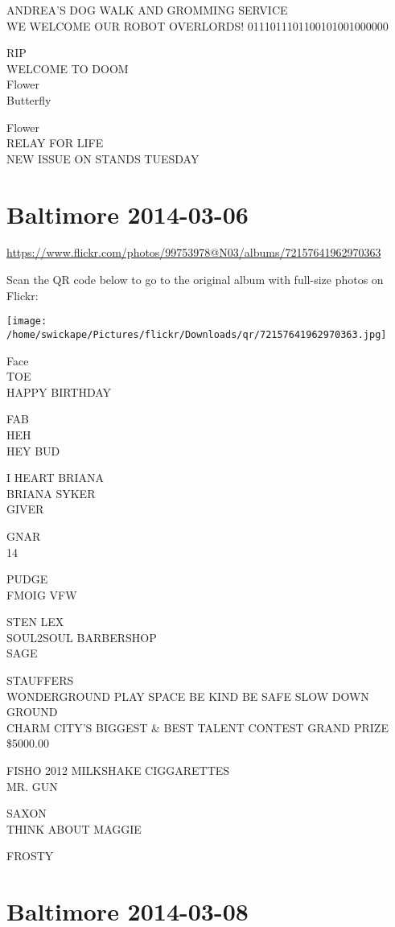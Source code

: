 \documentclass[10pt,letterpaper]{article}
\begin{document}
ANDREA'S DOG WALK AND GROMMING SERVICE\\
WE WELCOME OUR ROBOT OVERLORDS!  0111011101100101001000000

RIP\\
WELCOME TO DOOM\\
Flower\\
Butterfly

Flower\\
RELAY FOR LIFE\\
NEW ISSUE ON STANDS TUESDAY


\section*{Baltimore 2014-03-06}

\url{https://www.flickr.com/photos/99753978@N03/albums/72157641962970363}

Scan the QR code below to go to the original album with full-size photos on Flickr:

\texttt{[image: /home/swickape/Pictures/flickr/Downloads/qr/72157641962970363.jpg]}


Face\\
TOE\\
HAPPY BIRTHDAY

FAB\\
HEH\\
HEY BUD

I HEART BRIANA\\
BRIANA SYKER\\
GIVER

GNAR\\
14

PUDGE\\
FMOIG VFW

STEN LEX\\
SOUL2SOUL BARBERSHOP\\
SAGE

STAUFFERS\\
WONDERGROUND PLAY SPACE BE KIND BE SAFE SLOW DOWN\\
GROUND\\
CHARM CITY'S BIGGEST \& BEST TALENT CONTEST GRAND PRIZE \$5000.00

FISHO 2012 MILKSHAKE CIGGARETTES\\
MR. GUN

SAXON\\
THINK ABOUT MAGGIE

FROSTY


\section*{Baltimore 2014-03-08}
\end{document}
